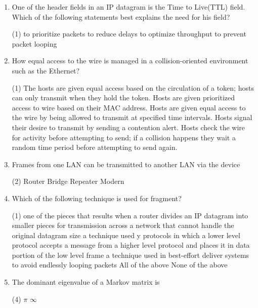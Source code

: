 \documentclass{exmppr}
\begin{document}
\begin{enumerate}
\begin{enumerate}
\item One of the header fields in an IP datagram is the Time to Live(TTL) field. Which of the following statements best explains the need for his field?
\begin{tasks}(1)
\task to prioritize packets
\task to reduce delays
\task to optimize throughput
\task to prevent packet looping
\end{tasks}

\item How equal access to the wire is managed in a collision-oriented environment such as the Ethernet?
\begin{tasks}(1)
\task The hosts are given equal access based on the circulation of a token; hosts can only transmit when they hold the token.
\task Hosts are given prioritized access to wire based on their MAC address.
\task Hosts are given equal access to the wire by being allowed to transmit at specified time intervals.
\task Hosts signal their desire to transmit by sending a contention alert.
\task Hosts check the wire for activity before attempting to send; if a collision happens they wait a random time period before attempting to send again.
\end{tasks}

\item Frames from one LAN can be transmitted to another LAN via the device
\begin{tasks}(2)
\task Router
\task Bridge
\task Repeater
\task Modern
\end{tasks}

\item Which of the following technique is used for fragment?
\begin{tasks}(1)
\task one of the pieces that results when a router divides an IP datagram into smaller pieces for transmission across a network that cannot handle the original datagram size
\task a technique used y protocols in which a lower level protocol accepts a message from a higher level protocol and places it in data portion of the low level frame
\task a technique used in best-effort deliver systems to avoid endlessly looping packets
\task All of the above
\task None of the above
\end{tasks}

\item The dominant eigenvalue of a Markov matrix is
\begin{tasks}(4)
\task $\pi$
\task $\infty$
\end{tasks}


\end{enumerate}
\end{enumerate}
\end{document}
